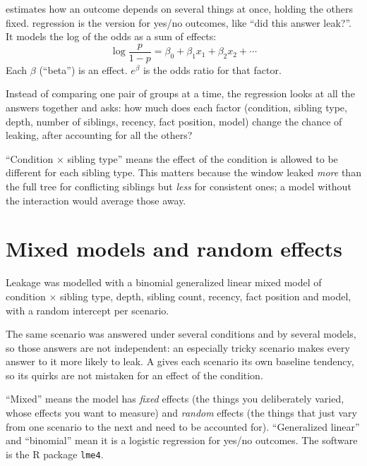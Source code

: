  estimates how an outcome depends on several things at once, holding the others fixed.  regression is the version for yes/no outcomes, like ``did this answer leak?''. It models the log of the odds as a sum of effects:
\[\log\frac{p}{1-p} = \beta_0 + \beta_1 x_1 + \beta_2 x_2 + \cdots\]
Each $\beta$ (``beta'') is an effect. $e^{\beta}$ is the odds ratio for that factor.

\begin{plain}
Instead of comparing one pair of groups at a time, the regression looks at all the answers together and asks: how much does each factor (condition, sibling type, depth, number of siblings, recency, fact position, model) change the chance of leaking, after accounting for all the others?
\end{plain}

 ``Condition $\times$ sibling type'' means the effect of the condition is allowed to be different for each sibling type. This matters because the window leaked \emph{more} than the full tree for conflicting siblings but \emph{less} for consistent ones; a model without the interaction would average those away.

\section{Mixed models and random effects}

\begin{paper}
Leakage was modelled with a binomial generalized linear mixed model of condition $\times$ sibling type, depth, sibling count, recency, fact position and model, with a random intercept per scenario.
\end{paper}

The same scenario was answered under several conditions and by several models, so those answers are not independent: an especially tricky scenario makes every answer to it more likely to leak. A  gives each scenario its own baseline tendency, so its quirks are not mistaken for an effect of the condition.

\begin{plain}
``Mixed'' means the model has \emph{fixed} effects (the things you deliberately varied, whose effects you want to measure) and \emph{random} effects (the things that just vary from one scenario to the next and need to be accounted for). ``Generalized linear'' and ``binomial'' mean it is a logistic regression for yes/no outcomes. The software is the R package \texttt{lme4}.
\end{plain}

